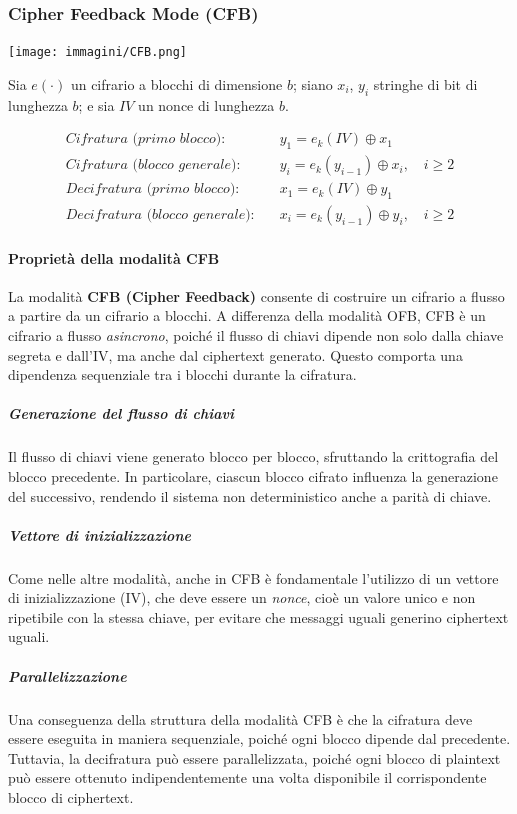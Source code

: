 \documentclass{report}
\begin{document}
\subsubsection{Cipher Feedback Mode (CFB)}

\texttt{[image: immagini/CFB.png]}

Sia \(e(\cdot)\) un cifrario a blocchi di dimensione \(b\); siano \(x_i\), \(y_i\)  stringhe di bit di lunghezza \(b\); e sia \(IV\) un nonce di lunghezza \(b\).

\begin{align*}
\textit{Cifratura (primo blocco):} \quad & y_1 = e_k(IV) \oplus x_1  \\
\textit{Cifratura (blocco generale):} \quad & y_i = e_k(y_{i-1}) \oplus x_i, \quad i \geq 2 \\
\textit{Decifratura (primo blocco):} \quad & x_1 = e_k(IV) \oplus y_1 \\
\textit{Decifratura (blocco generale):} \quad & x_i = e_k(y_{i-1}) \oplus y_i, \quad i \geq 2
\end{align*}

\paragraph{Proprietà della modalità CFB}

La modalità \textbf{CFB (Cipher Feedback)} consente di costruire un cifrario a flusso a partire da un cifrario a blocchi. A differenza della modalità OFB, CFB è un cifrario a flusso \textit{asincrono}, poiché il flusso di chiavi dipende non solo dalla chiave segreta e dall'IV, ma anche dal ciphertext generato. Questo comporta una dipendenza sequenziale tra i blocchi durante la cifratura.

\subparagraph{Generazione del flusso di chiavi}
Il flusso di chiavi viene generato blocco per blocco, sfruttando la crittografia del blocco precedente. In particolare, ciascun blocco cifrato influenza la generazione del successivo, rendendo il sistema non deterministico anche a parità di chiave.

\subparagraph{Vettore di inizializzazione}
Come nelle altre modalità, anche in CFB è fondamentale l’utilizzo di un vettore di inizializzazione (IV), che deve essere un \textit{nonce}, cioè un valore unico e non ripetibile con la stessa chiave, per evitare che messaggi uguali generino ciphertext uguali.

\subparagraph{Parallelizzazione}
Una conseguenza della struttura della modalità CFB è che la cifratura deve essere eseguita in maniera sequenziale, poiché ogni blocco dipende dal precedente. Tuttavia, la decifratura può essere parallelizzata, poiché ogni blocco di plaintext può essere ottenuto indipendentemente una volta disponibile il corrispondente blocco di ciphertext.
\end{document}
